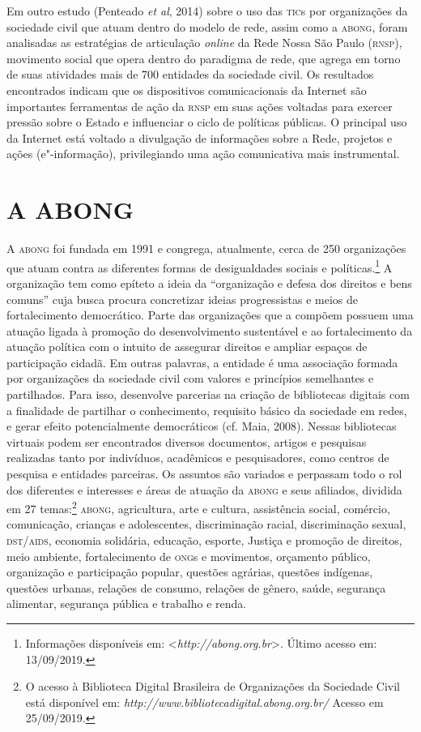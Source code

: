 Em outro estudo (Penteado \emph{et al}, 2014) sobre o uso das \textsc{tic}s por
organizações da sociedade civil que atuam dentro do modelo de rede,
assim como a \textsc{abong}, foram analisadas as estratégias de articulação
\emph{online} da Rede Nossa São Paulo (\textsc{rnsp}), movimento social que opera
dentro do paradigma de rede, que agrega em torno de suas atividades mais
de 700 entidades da sociedade civil. Os resultados encontrados indicam
que os dispositivos comunicacionais da Internet são importantes
ferramentas de ação da \textsc{rnsp} em suas ações voltadas para exercer pressão
sobre o Estado e influenciar o ciclo de políticas públicas. O principal
uso da Internet está voltado a divulgação de informações sobre a Rede,
projetos e ações (e"-informação), privilegiando uma ação comunicativa
mais instrumental.

\section{A ABONG}

A \textsc{abong} foi fundada em 1991 e congrega, atualmente, cerca de 250
organizações que atuam contra as diferentes formas de desigualdades
sociais e políticas.\footnote{Informações disponíveis em:
  \textless{}\emph{http://abong.org.br}\textgreater{}.
  Último acesso em: 13/09/2019.} A organização tem como epíteto a ideia
da ``organização e defesa dos direitos e bens comuns'' cuja busca procura
concretizar ideias progressistas e meios de fortalecimento democrático.
Parte das organizações que a compõem possuem uma atuação ligada à
promoção do desenvolvimento sustentável e ao fortalecimento da atuação
política com o intuito de assegurar direitos e ampliar espaços de
participação cidadã. Em outras palavras, a entidade é uma associação
formada por organizações da sociedade civil com valores e princípios
semelhantes e partilhados. Para isso, desenvolve parcerias na criação de
bibliotecas digitais com a finalidade de partilhar o conhecimento,
requisito básico da sociedade em redes, e gerar efeito potencialmente
democráticos (cf. Maia, 2008). Nessas bibliotecas virtuais podem ser
encontrados diversos documentos, artigos e pesquisas realizadas tanto
por indivíduos, acadêmicos e pesquisadores, como centros de pesquisa e
entidades parceiras. Os assuntos são variados e perpassam todo o rol dos
diferentes e interesses e áreas de atuação da \textsc{abong} e seus afiliados,
dividida em 27 temas:\footnote{O acesso à Biblioteca Digital Brasileira
  de Organizações da Sociedade Civil está disponível em:
  \emph{http://www.bibliotecadigital.abong.org.br/}
  Acesso em 25/09/2019.} \textsc{abong}, agricultura, arte e cultura,
assistência social, comércio, comunicação, crianças e adolescentes,
discriminação racial, discriminação sexual, \textsc{dst}/\textsc{aids}, economia
solidária, educação, esporte, Justiça e promoção de direitos, meio
ambiente, fortalecimento de \textsc{ong}s e movimentos, orçamento público,
organização e participação popular, questões agrárias, questões
indígenas, questões urbanas, relações de consumo, relações de gênero,
saúde, segurança alimentar, segurança pública e trabalho e renda.

